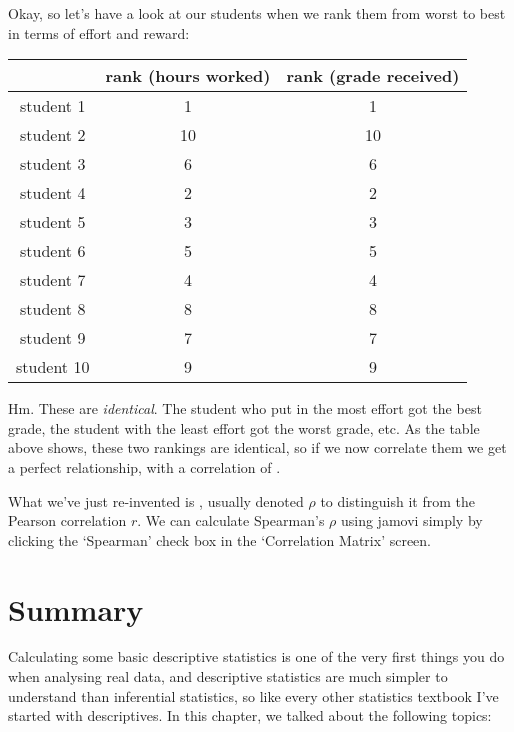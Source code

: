 Okay, so let's have a look at our students when we rank them from worst to best in terms of effort and reward: 
\begin{center}
\begin{tabular}{c|cc}
& rank (hours worked) & rank (grade received) \\ \hline
student    1 &   1 &   1 \\
student  2  & 10   &10 \\
student   3 &   6  &  6 \\
student    4 &   2 &   2 \\
student    5 &   3 &   3 \\
student   6  &  5  &  5 \\
student   7  &  4  &  4 \\
student   8  &  8  &  8 \\
student  9   & 7  &  7 \\
student   10  &  9&    9
\end{tabular}
\end{center}
Hm. These are {\it identical}. The student who put in the most effort got the best grade, the student with the least effort got the worst grade, etc. As the table above shows, these two rankings are identical, so if we now correlate them we get a perfect relationship, with a correlation of .

What we've just re-invented is , usually denoted $\rho$ to distinguish it from the Pearson correlation $r$. We can calculate Spearman's $\rho$ using jamovi simply by clicking the `Spearman' check box in the `Correlation Matrix' screen. 


\section{Summary}

Calculating some basic descriptive statistics is one of the very first things you do when analysing real data, and descriptive statistics are much simpler to understand than inferential statistics, so like every other statistics textbook I've started with descriptives. In this chapter, we talked about the following topics:

